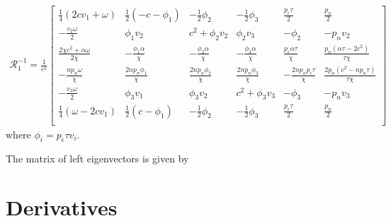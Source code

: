 \documentclass[onecolumn]{aastex62}
\begin{document}
\begin{align*}
  \mathcal{R}_{1}^{-1} = \frac{1}{c^2}
  \left[
  \begin{array}{cccccc}
   \frac{1}{4} (2 c  v_{1}+\omega ) & \frac{1}{2} (-c- \phi_{1} ) & -\frac{1}{2} \phi_{2}
    & -\frac{1}{2} \phi_{3}  & \frac{p_{\epsilon} \tau }{2} & \frac{p_{n}}{2}
     \\
   -\frac{v_{2} \omega }{2} & \phi_{1} v_{2}  & c^2+\phi_{2} v_{2}  &
     \phi_{2} v_{3}  & -\phi_{2}  & -p_{n} v_{2} \\
   \frac{2 \chi  c^2+\alpha  \omega }{2 \chi } & -\frac{\phi_{1} \alpha  }{\chi } &
     -\frac{\phi_{2} \alpha  }{\chi } & -\frac{\phi_{3} \alpha }{\chi } &
     \frac{p_{\epsilon} \alpha  \tau }{\chi } & \frac{p_{n} \left(\alpha  \tau -2 c^2\right)}{\tau  \chi } \\
   -\frac{n p_{n} \omega }{\chi } & \frac{2 n p_{n} \phi_{1} }{\chi } & \frac{2 n p_{n}
     \phi_{2} }{\chi } & \frac{2 n p_{n} \phi_{3} }{\chi } & -\frac{2 n
     p_{n} p_{\epsilon} \tau }{\chi } & \frac{2 p_{n} \left(c^2-n p_{n} \tau \right)}{\tau  \chi } \\
   -\frac{v_{3} \omega }{2} & \phi_{3} v_{1}  & \phi_{3} v_{2}   &
     c^2+\phi_{3} v_{3}  & -\phi_{3}  & -p_{n} v_{3} \\
   \frac{1}{4} (\omega -2 c  v_{1}) & \frac{1}{2} (c-\phi_{1} ) & -\frac{1}{2} \phi_{2}
       & -\frac{1}{2} \phi_{3}  & \frac{p_{\epsilon} \tau }{2} & \frac{p_{n}}{2}
     \\
  \end{array}
  \right]
\end{align*}
where $\phi_{i} = p_{\epsilon}\tau v_{i}$.

The matrix of left eigenvectors is given by


\section{Derivatives}
\end{document}
